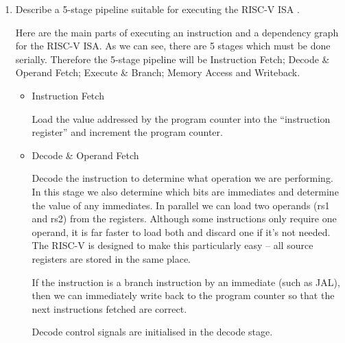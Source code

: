 \documentclass[10pt,\jkfside,a4paper]{article}
\begin{document}
\begin{enumerate}

\item Describe a 5-stage pipeline suitable for executing the RISC-V ISA .

Here are the main parts of executing an instruction and a dependency
graph for the RISC-V ISA. As we can see, there are 5 stages which must be done
serially. Therefore the 5-stage pipeline will be Instruction Fetch;
Decode \& Operand Fetch; Execute \& Branch; Memory Access and Writeback.

\begin{center}
\end{center}

\begin{itemize}

\item Instruction Fetch

Load the value addressed by the program counter into the ``instruction
register'' and increment the program counter.

\item Decode \& Operand Fetch

Decode the instruction to determine what operation we are performing. In
this stage we also determine which bits are immediates and determine the
value of any immediates. In parallel we can load two operands (rs1 and rs2)
from the registers. Although some instructions only require one operand, it
is far faster to load both and discard one if it's not needed. The RISC-V is
designed to make this particularly easy -- all source registers are stored
in the same place.

If the instruction is a branch instruction by an immediate (such as JAL),
then we can immediately write back to the program counter so that the next
instructions fetched are correct.

Decode control signals are initialised in the decode stage.


\end{itemize}
\end{enumerate}
\end{document}
